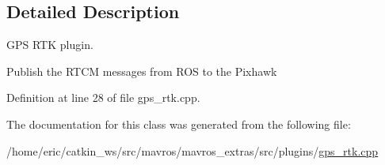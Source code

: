\subsection{Detailed Description}
G\+PS R\+TK plugin. 

Publish the R\+T\+CM messages from R\+OS to the Pixhawk 

Definition at line 28 of file gps\+\_\+rtk.\+cpp.



The documentation for this class was generated from the following file\+:\begin{DoxyCompactItemize}
\item 
/home/eric/catkin\+\_\+ws/src/mavros/mavros\+\_\+extras/src/plugins/\mbox{\hyperlink{gps__rtk_8cpp}{gps\+\_\+rtk.\+cpp}}\end{DoxyCompactItemize}
